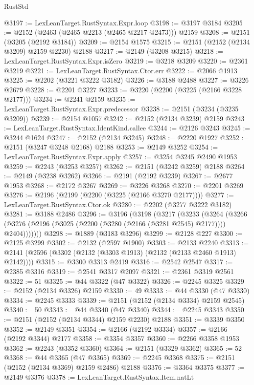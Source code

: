 \begin{lexlean}{RustStd}
\begin{coremodule}
@3197 := LexLeanTarget.RustSyntax.Expr.loop
@3198 := @3197 @3184
@3205 := @2152 (@2463 (@2465 @2213 (@2465 @2217 @2473))) @2159
@3208 := @2151 (@3205 (@2192 @3184))
@3209 := @2154 @1575
@3215 := @2151 (@2152 (@2134 @3209) @2159 @2230) @2188
@3217 := @2149 (@3208 @3215)
@3218 := LexLeanTarget.RustSyntax.Expr.isZero
@3219 := @3218 @3209
@3220 := @2361 @3219
@3221 := LexLeanTarget.RustSyntax.Ctor.err
@3222 := @2066 @1913
@3225 := @2202 (@3221 @3222 @3182)
@3226 := @3188 @2488
@3227 := @3226 @2679
@3228 := @2201 @3227
@3233 := @3220 (@2200 (@3225 (@2166 @3228 @2177)))
@3234 := @2241 @2159
@3235 := LexLeanTarget.RustSyntax.Expr.predecessor
@3238 := @2151 (@3234 (@3235 @3209))
@3239 := @2154 @1057
@3242 := @2152 (@2134 @3239) @2159
@3243 := LexLeanTarget.RustSyntax.IdentKind.callee
@3244 := @2126 @3243
@3245 := @3244 @1624
@3247 := @2152 (@2134 @3245)
@3248 := @2220 @1927
@3252 := @2151 (@3247 @3248 @2168) @2188
@3253 := @2149 @3252
@3254 := LexLeanTarget.RustSyntax.Expr.apply
@3257 := @3254 @3245 @2490 @1953
@3259 := @2243 (@3253 @3257)
@3262 := @2151 (@3242 @3259) @2188
@3264 := @2149 (@3238 @3262)
@3266 := @2191 (@2192 @3239)
@3267 := @2677 @1953
@3268 := @2172 @3267
@3269 := @3226 @3268
@3270 := @2201 @3269
@3276 := @2196 (@2199 (@2200 (@3225 (@2166 @3270 @2177))))
@3277 := LexLeanTarget.RustSyntax.Ctor.ok
@3280 := @2202 (@3277 @3222 @3182)
@3281 := @3188 @2486
@3296 := @3196
    (@3198
      (@3217
        (@3233
          (@3264
            (@3266 (@3276 (@2196 (@3025 (@2200 (@3280 (@2166 (@3281 @2545) @2177)))) @2404)))))))
@3298 := @1889 (@3183 @3296)
@3299 := @2128 @227
@3300 := @2125 @3299
@3302 := @2132 (@2597 @1900)
@3303 := @2133 @2240
@3313 := @2141 (@2596 (@3302 (@2132 (@3303 @1913) (@2132 (@2133 @2460 @1913) @2142))))
@3315 := @3300 @3313 @2419
@3316 := @2542 @2547
@3317 := @2385 @3316
@3319 := @2541 @3317 @2097
@3321 := @2361 @3319 @2561
@3322 := 51
@3325 := @44 @3322 (@47 @3322)
@3326 := @2245 @3325
@3329 := @2152 (@2134 @3326) @2159
@3330 := 49
@3333 := @44 @3330 (@47 @3330)
@3334 := @2245 @3333
@3339 := @2151 (@2152 (@2134 @3334) @2159 @2545)
@3340 := 50
@3343 := @44 @3340 (@47 @3340)
@3344 := @2245 @3343
@3350 := @2151 (@2152 (@2134 @3344) @2159 @2230) @2188
@3351 := @3339 @3350
@3352 := @2149 @3351
@3354 := @2166 (@2192 @3334)
@3357 := @2166 (@2192 @3344) @2177
@3358 := @3354 @3357
@3360 := @2266 @3358 @1953
@3362 := @2243 (@3352 @3360)
@3364 := @2151 (@3329 @3362)
@3365 := 52
@3368 := @44 @3365 (@47 @3365)
@3369 := @2245 @3368
@3375 := @2151 (@2152 (@2134 @3369) @2159 @2486) @2188
@3376 := @3364 @3375
@3377 := @2149 @3376
@3378 := LexLeanTarget.RustSyntax.Item.natLt

\end{coremodule}
\end{lexlean}
